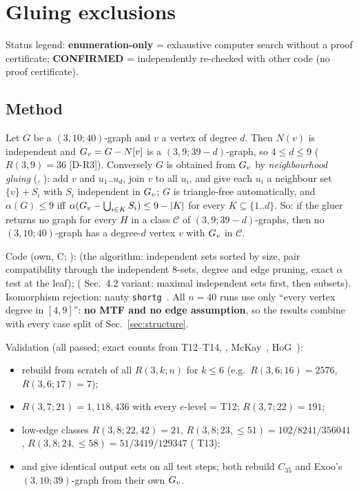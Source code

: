 \section{Gluing exclusions}\label{sec:glue}

Status legend: \textbf{enumeration-only} = exhaustive computer search without a proof certificate;
\textbf{CONFIRMED} = independently re-checked with other code (no proof certificate).

\subsection{Method}\label{sec:glue-method}
Let $G$ be a $(3,10;40)$-graph and $v$ a vertex of degree $d$. Then $N(v)$ is independent and
$G_{v} = G - N[v]$ is a $(3,9;39-d)$-graph, so $4 \le d \le 9$ ($R(3,9) = 36$ [D-R3]). Conversely $G$ is obtained
from $G_{v}$ by \emph{neighbourhood gluing} (\cite[Sec.~3]{GR}, \cite[Sec.~4]{Ang}): add $v$ and $u_1..u_d$, join $v$ to all $u_i$,
and give each $u_i$ a neighbour set $\{v\} + S_i$ with $S_i$ independent in $G_{v}$; $G$ is triangle-free automatically,
and $\alpha(G) \le 9$ iff $\alpha(G_{v} - \bigcup_{i \in K} S_i) \le 9 - |K|$ for every $K \subseteq \{1..d\}$.
So: if the gluer returns no graph for every $H$ in a class $\mathcal{C}$ of $(3,9;39-d)$-graphs, then no $(3,10;40)$-graph
has a degree-$d$ vertex $v$ with $G_{v}$ in $\mathcal{C}$.

Code (own, C; ):  (the \cite{GR} algorithm: independent sets sorted by size, pair
compatibility through the independent 8-sets, degree and edge pruning, exact $\alpha$ test at the leaf);
 (\cite{Ang} Sec.~4.2 variant: maximal independent sets first, then subsets). Isomorphism rejection:
nauty \texttt{shortg}~\cite{nauty14}. All $n = 40$ runs use only ``every vertex degree in $[4,9]$'': \textbf{no MTF and no edge assumption},
so the results combine with every case split of Sec.~\ref{sec:structure}.

Validation (all passed; exact counts from \cite{GR} T12--T14, \cite{Ang}, McKay~\cite{McKayWeb}, HoG~\cite{HoG23}):
\begin{itemize}
\item rebuild from scratch of all $R(3,k;n)$ for $k \le 6$ (e.g.\ $R(3,6;16) = 2576$, $R(3,6;17) = 7$);
\item $R(3,7;21) = 1{,}118{,}436$ with every $e$-level = \cite{GR} T12; $R(3,7;22) = 191$;
\item low-edge classes $R(3,8;22,42) = 21$, $R(3,8;23,{\le}51) = 102/8241/356041$, $R(3,8;24,{\le}58) = 51/3419/129347$ (\cite{GR} T13);
\item {} and  give identical output sets on all test steps; both rebuild $C_{35}$ and Exoo's $(3,10;39)$-graph
  from their own $G_{v}$.
\end{itemize}

